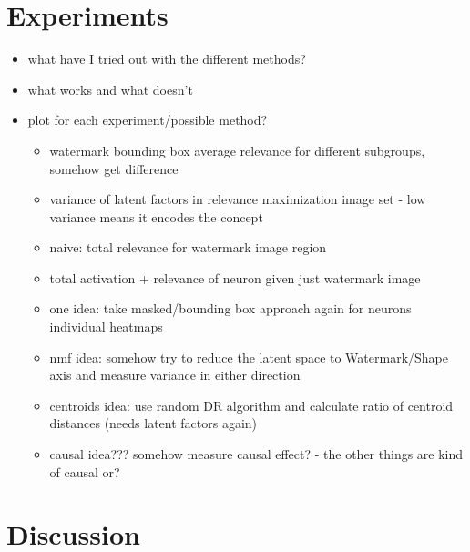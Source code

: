\section{Experiments} 
\begin{itemize}
    \item what have I tried out with the different methods? 
    \item what works and what doesn't
    \item plot for each experiment/possible method?
    \begin{itemize}
        \item watermark bounding box average relevance for different subgroups, 
        \\ somehow get difference
        \item variance of latent factors in relevance maximization image set - low variance means it encodes the concept
        \item naive: total relevance for watermark image region
        \item total activation + relevance of neuron given just watermark image
        \item one idea: take masked/bounding box approach again for neurons individual heatmaps
        \item nmf idea: somehow try to reduce the latent space to Watermark/Shape axis and measure variance in either direction
        \item centroids idea: use random DR algorithm and calculate ratio of centroid distances (needs latent factors again)
        \item causal idea??? somehow measure causal effect? - the other things are kind of causal or?
    \end{itemize}
\end{itemize}

\section{Discussion}


